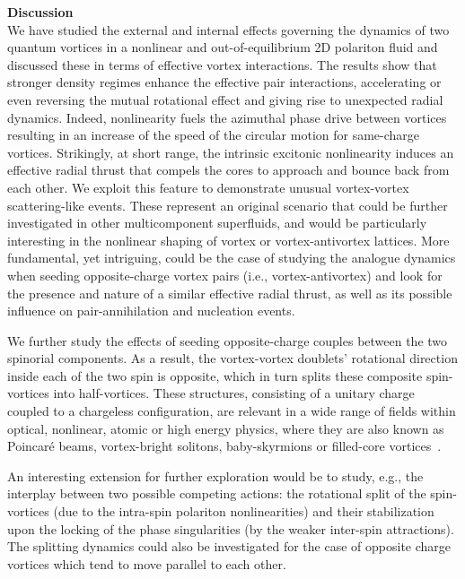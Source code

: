 \documentclass[aps,prb,twocolumn,superscriptaddress,nofootinbib]{revtex4}
\def\editr#1{#1}
\def\refer#1{#1}
\def\edstrike#1{}
\begin{document}
\noindent \editr{\textbf{Discussion}}\\
%
We have studied the external and internal \edstrike{driving actions}
\editr{effects governing the dynamics}
of two quantum vortices
in a nonlinear and out-of-equilibrium 2D polariton fluid
\editr{and discussed these in terms of effective vortex interactions.}
%
The results show that stronger density regimes
enhance the \edstrike{vortex-vortex} \refer{effective pair} interactions,
accelerating or even reversing the mutual rotation\editr{al} effect
and giving rise to unexpected radial dynamics.
%
Indeed, nonlinearity fuels the azimuthal phase drive between vortices
resulting in an increase of the speed of the circular motion for same-charge vortices.
%
Strikingly, at short range,
the intrinsic excitonic nonlinearity induces
an effective radial thrust
that compels the cores to approach and bounce back from each other.
%
We exploit this feature
to demonstrate \edstrike{novel} \editr{unusual} vortex-vortex scattering\refer{-like} events.
These represent an original scenario that could be further investigated in other multicomponent superfluids,
and would be particularly interesting in the nonlinear shaping of vortex or vortex-antivortex lattices.
\editr{More fundamental, yet intriguing, could be the case of studying the analogue dynamics when seeding opposite-charge vortex pairs (i.e., vortex-antivortex) 
and look for the presence and nature of a similar effective radial thrust, as well as its 
possible influence on pair-annihilation and nucleation events.}

\edstrike{The phase singularities in each of the two spinorial populations
represent elementary point-like particles with two associated quantum numbers,
the SAM and OAM (e.g., ${\alpha}^{\text{SAM}}_{\text{OAM}}$).
Depending on the direction of the quantum numbers,
different vortex combinations are possible.
Indeed we} \editr{We} further study the effects of 
seeding opposite-charge couples
between the two spinorial components. 
As a result, the vortex-vortex
doublets' rotational direction in\editr{side} each of the two spin is opposite,
 which in turn
splits these composite spin-vortices into \editr{half-vortices}\edstrike{ baby-skyrmions}.
%
These structures, consisting of a unitary charge coupled to
a chargeless configuration,
are relevant in a wide range of fields
within optical, nonlinear, atomic or high energy physics,
where they are also known as Poincar\'{e} beams, vortex-bright solitons,
 \edstrike{half-vortices}\editr{ baby-skyrmions} or filled-core vortices~\cite{Cardano2013,DarkBook,Kevrekidis2016140}.
\editr{
An interesting extension for further exploration would be to study,
e.g., the interplay between two possible competing actions:
the rotational split of the spin-vortices
(due to the intra-spin polariton nonlinearities)
and their stabilization upon the locking of the phase singularities
(by the weaker inter-spin attractions).
The splitting dynamics could  also be investigated for the case of 
opposite charge vortices which tend to move parallel to each other.}
\end{document}
